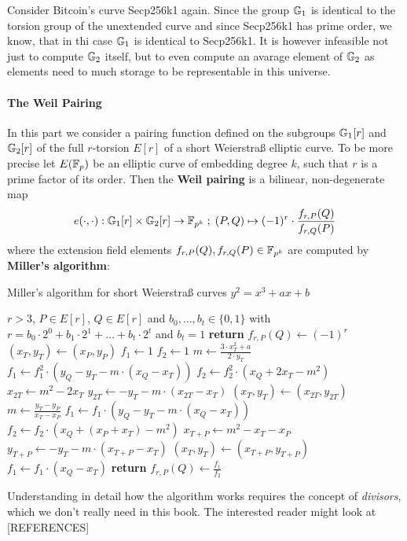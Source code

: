 \begin{example}Consider Bitcoin's curve Secp256k1 again. Since the group $\mathbb{G}_1$ is identical to the torsion group of the unextended curve and since Secp256k1 has prime order, we know, that in thi case $\mathbb{G}_1$ is identical to Secp256k1. It is however infeasible not just to compute $\mathbb{G}_2$ itself, but to even compute an avarage element of $\mathbb{G}_2$ as elements need to much storage to be representable in this universe.
\end{example}
\paragraph{The Weil Pairing} In this part we consider a pairing function defined on
the subgroups $\mathbb{G}_1[r]$ and $\mathbb{G}_2[r]$ of the full $r$-torsion $E[r]$ of a short Weierstraß elliptic curve. To be more precise let $E(\mathbb{F}_p)$ be an elliptic curve of embedding degree $k$, such that $r$ is a prime factor of its order. Then the \textbf{Weil pairing} is a bilinear, non-degenerate map
\begin{equation}
e(\cdot,\cdot) : \mathbb{G}_1[r] \times \mathbb{G}_2[r] \to \mathbb{F}_{p^k}\; ;\; 
(P,Q)\mapsto (-1)^r \cdot \frac{f_{r,P}(Q)}{f_{r,Q}(P)}
\end{equation} 
where the extension field elements $f_{r,P}(Q), f_{r,Q}(P)\in \mathbb{F}_{p^k}$ are computed by \textbf{Miller's algorithm}:
\begin{algorithm}\caption{Miller's algorithm for short Weierstraß curves $y^2 = x^3 +ax +b$}
\label{alg_projective_group_law}
\begin{algorithmic}[0]
\Require $r>3$, $P \in E[r]$, $Q\in E[r]$ and
\State $b_0,\ldots, b_t\in \{0,1\}$ with $r= b_0\cdot 2^0 + b_1\cdot 2^1 + \ldots + b_t\cdot 2^t$ and $b_t=1$
	\State \textbf{return} $f_{r,P}(Q) \gets (-1)^r$
\EndIf
\State $(x_T,y_T) \gets (x_P,y_P)$
\State $f_1\gets 1$
\State $f_2\gets 1$
	\State $m \gets \frac{3\cdot x_T^2+a}{2\cdot y_T}$	
    \State $f_1 \gets f_1^2\cdot (y_Q - y_T - m\cdot(x_Q-x_T))$
	\State $f_2 \gets f_2^2\cdot (x_Q + 2x_T -m^2)$
	\State $x_{2T} \gets m^2 - 2 x_T$
	\State $y_{2T} \gets -y_T - m\cdot (x_{2T}-x_T)$
	\State $(x_T,y_T)\gets (x_{2T},y_{2T})$ 
		\State $m \gets \frac{y_T -y_P}{x_T - x_P}$
		\State $f_1 \gets f_1\cdot (y_Q -y_T -m\cdot (x_Q - x_T))$
		\State $f_2 \gets f_2\cdot (x_Q + (x_P+x_T) - m^2)$
		\State $x_{T+P} \gets m^2 -x_T -x_P$
		\State $y_{T+P}\gets -y_T - m\cdot (x_{T+P}-x_T)$
		\State $(x_T,y_T)\gets (x_{T+P},y_{T+P})$
	\EndIf
\EndFor
\State $f_1 \gets f_1\cdot (x_Q - x_T)$
\State \textbf{return} $f_{r,P}(Q) \gets \frac{f_1}{f_2}$
\EndProcedure
\end{algorithmic}
\end{algorithm}
Understanding in detail how the algorithm works requires the concept of \textit{divisors}, which we don't really need in this book. The interested reader might look at [REFERENCES]

